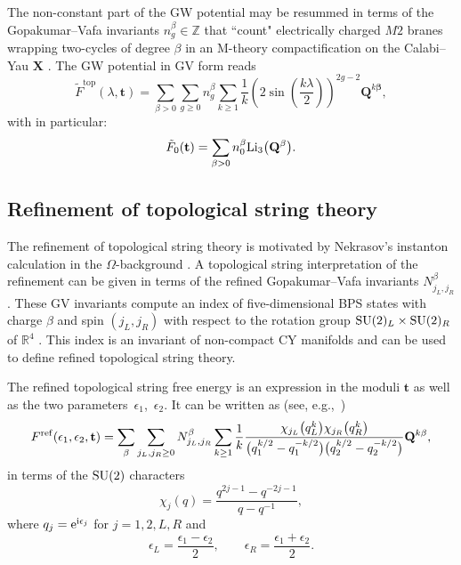 \documentclass[pdftex]{sigma}
\numberwithin{equation}{section}
\begin{document}
The non-constant part of the GW potential may be resummed in terms of the Gopakumar--Vafa invariants $n_g^{\beta} \in \mathbb{Z}$ that ``count" electrically charged $M2$ branes wrapping two-cycles of degree $\beta$ in an M-theory compactification on the Calabi--Yau $\mathbf{X}$ \cite{Gopakumar:1998ii,Gopakumar:1998jq}. The GW potential in GV form reads
\begin{equation*}%
\tilde{F}^\mathrm{top}(\lambda,\mathbf{t})= \sum_{\beta>0}\sum_{g\ge 0} n_g^{\beta} \sum_{k\ge 1} \frac{1}{k} \left( 2 \sin \left( \frac{k\lambda}{2}\right)\right)^{2g-2} \mathbf{Q}^{k\mathbf{\beta}},
\end{equation*}
with in particular:
\begin{equation*}
\tilde{F}_0(\mathbf{t})=\sum_{\mathbf{\beta}>0} n^{\beta}_0 {\rm Li}_3\big(\mathbf{Q}^{\mathbf{\beta}}\big).
\end{equation*}

\subsection{Refinement of topological string theory}

The refinement of topological string theory is motivated by Nekrasov's instanton calculation in the $\Omega$-background \cite{Nekrasov:2002qd}. A topological string interpretation of the refinement can be given in terms of the refined Gopakumar--Vafa invariants $N_{j_L,j_R}^{\beta}$. These GV invariants compute an index of five-dimensional BPS states with charge $\beta$ and spin $(j_L,j_R)$ with respect to the rotation group ${\rm SU}(2)_L\times {\rm SU}(2)_R$ of $\mathbb{R}^4$ \cite{IKV}. This index is an invariant of non-compact CY manifolds and can be used to define refined topological string theory.

The refined topological string free energy is an expression in the moduli $\mathbf{t}$ as well as the two parameters~$\epsilon_1$,~$\epsilon_2$. It can be written as (see, e.g.,~\cite{Hatsuda:2013oxa, Huang:2010kf})
\begin{equation*}
F^{{\rm ref}}(\epsilon_1,\epsilon_2,\mathbf{t})= \sum_{\beta} \sum_{j_L,j_R\ge 0} N_{j_L,j_R}^{\beta} \sum_{k\ge 1} \frac{1}{k} \frac{\chi_{j_L}\big(q^k_L\big) \chi_{j_R}\big(q^k_R\big) }{\big(q_1^{k/2}-q_1^{-k/2}\big)\big(q_2^{k/2}-q_2^{-k/2}\big)} \mathbf{Q}^{k\beta},
\end{equation*}
in terms of the ${\rm SU}(2)$ characters
\begin{equation*}
\chi_j(q) =\frac{q^{2j-1}-q^{-2j-1}}{q-q^{-1}},
\end{equation*}
where $q_j = {\rm e}^{\mathrm{i}\epsilon_j}$ for $j=1,2,L,R$ and
\begin{equation*}
 \epsilon_{L} = \frac{\epsilon_1-\epsilon_2}{2}, \qquad \epsilon_R= \frac{\epsilon_1+\epsilon_2}{2}.
 \end{equation*}
\end{document}
